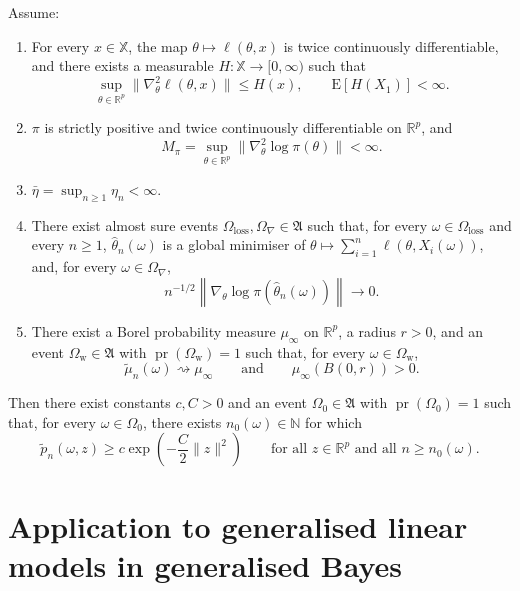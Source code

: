 \documentclass[11pt]{article}
\renewcommand{\Pr}{\operatorname{pr}}
\theoremstyle{plain}
\theoremstyle{definition}
\theoremstyle{remark}
\begin{document}
\begin{thm} \label{thm:gp-envelope} Assume:
\begin{enumerate}
\item[$\mathrm{(C1)}$] For every $x\in\mathbb{X}$, the map $\theta\mapsto\ell(\theta,x)$
is twice continuously differentiable, and there exists a measurable
$H:\mathbb{X}\to[0,\infty)$ such that
\[
\sup_{\theta\in\mathbb{R}^{p}}\|\nabla_{\theta}^{2}\ell(\theta,x)\|\le H(x),\qquad\mathrm{E}[H(X_{1})]<\infty.
\]
\item[$\mathrm{(C2)}$] $\pi$ is strictly positive and twice continuously differentiable
on $\mathbb{R}^{p}$, and
\[
M_{\pi}=\sup_{\theta\in\mathbb{R}^{p}}\|\nabla_{\theta}^{2}\log\pi(\theta)\|<\infty.
\]
\item[$\mathrm{(C3)}$] $\bar{\eta}=\sup_{n\ge1}\eta_{n}<\infty$.
\item[$\mathrm{(C4)}$] There exist almost sure events $\Omega_{\mathrm{loss}},\Omega_{\nabla}\in\mathfrak{A}$
such that, for every $\omega\in\Omega_{\mathrm{loss}}$ and every
$n\ge1$, $\hat{\theta}_{n}(\omega)$ is a global minimiser of $\theta\mapsto\sum_{i=1}^{n}\ell(\theta,X_{i}(\omega))$,
and, for every $\omega\in\Omega_{\nabla}$,
\[
n^{-1/2}\left\|\nabla_{\theta}\log\pi\left(\hat{\theta}_{n}(\omega)\right)\right\|\to0.
\]
\item[$\mathrm{(C5)}$] There exist a Borel probability measure $\mu_{\infty}$ on $\mathbb{R}^{p}$,
a radius $r>0$, and an event $\Omega_{\mathrm{w}}\in\mathfrak{A}$
with $\Pr(\Omega_{\mathrm{w}})=1$ such that, for every $\omega\in\Omega_{\mathrm{w}}$,
\[
\tilde\mu_n(\omega)\rightsquigarrow\mu_{\infty}\qquad\text{and}\qquad\mu_{\infty}(B(0,r))>0.
\]
\end{enumerate}
Then there exist constants $c,C>0$ and an event $\Omega_{0}\in\mathfrak{A}$
with $\Pr(\Omega_{0})=1$ such that, for every $\omega\in\Omega_{0}$,
there exists $n_{0}(\omega)\in\mathbb{N}$ for which
\begin{equation}
\tilde p_{n}(\omega,z)\ge c\exp\left(-\frac{C}{2}\|z\|^{2}\right)\qquad\text{for all }z\in\mathbb{R}^{p}\text{ and all }n\ge n_{0}(\omega).\label{eq:Gen_Bayes_Lower_bound}
\end{equation}
\end{thm}


\section{Application to generalised linear models in generalised Bayes}
\end{document}
